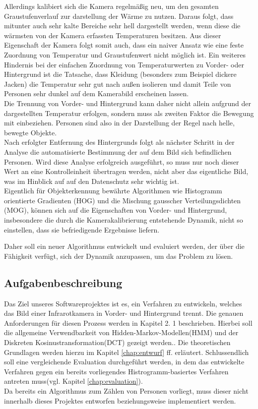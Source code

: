 Allerdings kalibiert sich die Kamera regelmäßig neu, um den gesamten Graustufenverlauf zur darstellung der Wärme zu nutzen. Daraus folgt, dass mitunter auch sehr kalte Bereiche sehr hell dargestellt werden, wenn diese die wärmsten von der Kamera erfassten Temperaturen besitzen.
Aus dieser Eigenschaft der Kamera folgt somit auch, dass ein naiver Ansatz wie eine feste Zuordnung von Temperatur und Graustufenwert nicht möglich ist. Ein weiteres Hindernis bei der einfachen Zuordnung von Temperaturwerten zu Vorder- oder Hintergrund ist die Tatsache, dass Kleidung (besonders zum Beispiel dickere Jacken) die Temperatur sehr gut nach außen isolieren und damit Teile von Personen sehr dunkel auf dem Kamerabild erscheinen lassen.\\
Die Trennung von Vorder- und Hintergrund kann daher nicht allein aufgrund der dargestellten Temperatur erfolgen, sondern muss als zweiten Faktor die Bewegung mit einbeziehen.
Personen sind also in der Darstellung der Regel nach helle, bewegte Objekte.\\
Nach erfolgter Entfernung des Hintergrunds folgt als nächster Schritt in der Analyse die automatisierte Bestimmung der auf dem Bild sich befindlichen Personen.
Wird diese Analyse erfolgreich ausgeführt, so muss nur noch dieser Wert an eine Kontrolleinheit übertragen werden, nicht aber das eigentliche Bild, was im Hinblick auf auf den Datenschutz sehr wichtig ist.\\
Eigentlich für Objekterkennung bewährte Algorithmen wie Histogramm orientierte Gradienten (HOG)\cite{Dalal05histogramsof} und die Mischung gausscher Verteilungsdichten (MOG)\cite{DBLP:conf/focs/Dasgupta99}, können sich auf die Eigenschaften von Vorder- und Hintergrund, insbesondere die durch die Kamerakalibrierung entstehende Dynamik, nicht so einstellen, dass sie befriedigende Ergebnisse liefern.

Daher soll ein neuer Algorithmus entwickelt und evaluiert werden, der über die Fähigkeit verfügt, sich der Dynamik anzupassen, um das Problem zu lösen.\\


\subsection{Aufgabenbeschreibung}
\label{sec:aufgabenbeschreibung}

Das Ziel unseres Softwareprojektes ist es, ein Verfahren zu entwickeln, welches das Bild einer Infrarotkamera in Vorder- und Hintergrund trennt.
 Die genauen Anforderungen für diesen Prozess werden in Kapitel 2.
1 beschrieben.
 Hierbei soll die allgemeine Verwendbarkeit von Hidden-Markov-Modellen(HMM)\cite{Stamp04arevealing} und der Diskreten Kosinustransformation(DCT)\cite{Khayam03thediscrete} gezeigt werden..
 Die theoretischen Grundlagen werden hierzu im Kapitel \ref{chap:entwurf} ff. erläutert.
 Schlussendlich soll eine vergleichende Evaluation durchgeführt werden, in dem das entwickelte Verfahren gegen ein bereits vorliegendes Histrogramm-basiertes Verfahren antreten muss(vgl. Kapitel \ref{chap:evaluation}).\\
Da bereits ein Algorithmus zum Zählen von Personen vorliegt, muss dieser nicht innerhalb dieses Projektes entworfen beziehungsweise implementiert werden.

